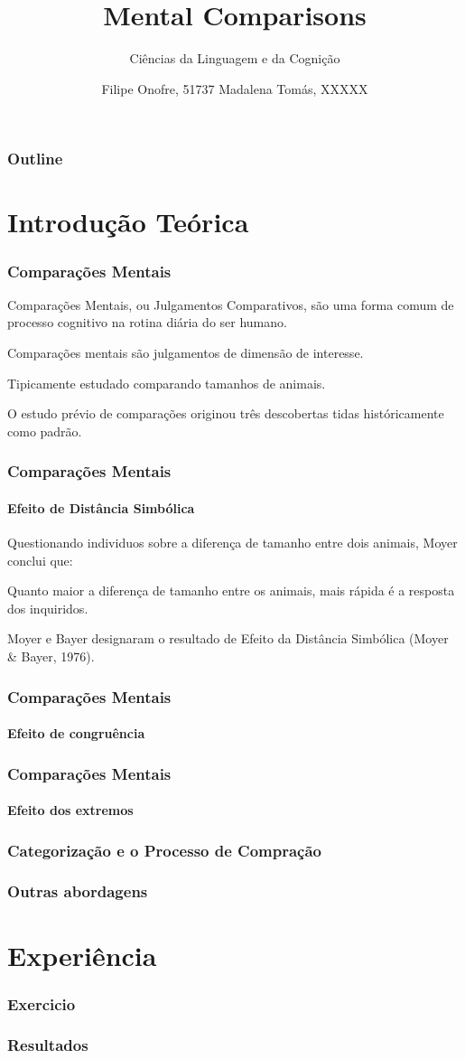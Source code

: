 \documentclass{beamer}
\title{Mental Comparisons}
\subtitle{Ciências da Linguagem e da Cognição}
\author{Filipe Onofre, 51737 \linebreak Madalena Tomás, XXXXX}
\begin{document}
\begin{frame}
	\titlepage
\end{frame}
\begin{frame}
	\frametitle{Outline}
	\tableofcontents
\end{frame}

\section{Introdução Teórica}

\begin{frame}
	\frametitle{Comparações Mentais}
	\begin{description}
		\item Comparações Mentais, ou Julgamentos Comparativos, são uma forma comum de processo cognitivo na rotina diária do ser humano.
		\item Comparações mentais são julgamentos de dimensão de interesse.
		\item Tipicamente estudado comparando tamanhos de animais.
		\item O estudo prévio de comparações originou três descobertas tidas históricamente como padrão. 
	\end{description}
\end{frame}
\begin{frame}
	\frametitle{Comparações Mentais}
	\framesubtitle{Efeito de Distância Simbólica}
	Questionando individuos sobre a diferença de tamanho entre dois animais, Moyer conclui que:
	\begin{description}
	\item Quanto maior a diferença de tamanho entre os animais, mais rápida é a resposta dos inquiridos.
	\item 	Moyer e Bayer designaram o resultado de Efeito da Distância Simbólica
	(Moyer \& Bayer, 1976).
	\end{description}
\end{frame}
\begin{frame}
	\frametitle{Comparações Mentais}
	\framesubtitle{Efeito de congruência}
\end{frame}
\begin{frame}
	\frametitle{Comparações Mentais}
	\framesubtitle{Efeito dos extremos}
\end{frame}
\begin{frame}
	\frametitle{Categorização e o Processo de Compração}
\end{frame}
\begin{frame}
	\frametitle{Outras abordagens}
\end{frame}
\section{Experiência}
\begin{frame}
	\frametitle{Exercicio}
\end{frame}
\begin{frame}
	\frametitle{Resultados}
\end{frame}
\end{document}
